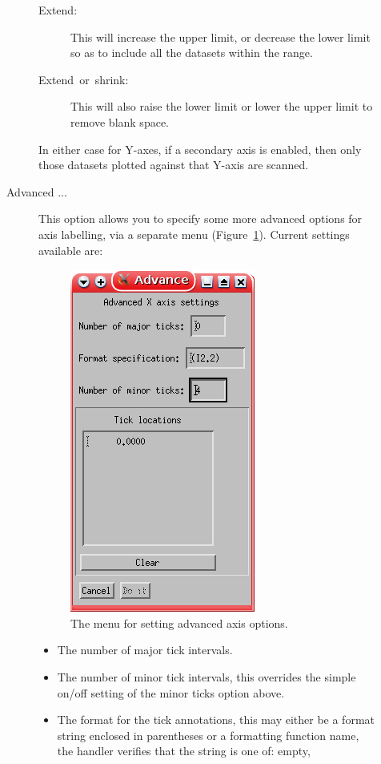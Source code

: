 \documentclass[11pt,twoside,english]{article}
\begin{document}
\begin{description}
\begin{description}
  \begin{description}
  \item [Extend:]This will increase the upper limit, or decrease the
    lower limit so as to include all the datasets within the range.
  \item [Extend~or~shrink:]This will also raise the lower limit or
    lower the upper limit to remove blank space.
  \end{description}
  In either case for Y-axes, if a secondary axis is enabled, then only
  those datasets plotted against that Y-axis are scanned.
\item[Advanced ...] This option allows you to specify some more
  advanced options for axis labelling, via a separate menu
  (Figure~\ref{fig:adv-axis-menu}). Current
  settings available are:
  \begin{figure}
    \centering
    \includegraphics{axis_adv}
    \caption{The menu for setting advanced axis options.}
    \label{fig:adv-axis-menu}
  \end{figure}
  \begin{itemize}
  \item The number of major tick intervals.
  \item The number of minor tick intervals, this overrides the simple
    on/off setting of the minor ticks option above.
  \item The format for the tick annotations, this may either be a
    format string enclosed in parentheses or a formatting function
    name, the handler verifies that the string is one of: empty,

\end{itemize}
\end{description}
\end{description}
\end{document}
